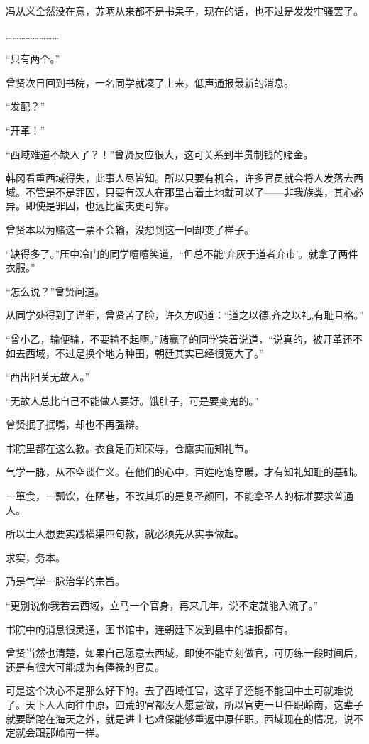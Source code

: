 冯从义全然没在意，苏昞从来都不是书呆子，现在的话，也不过是发发牢骚罢了。

……………………

“只有两个。”

曾贤次日回到书院，一名同学就凑了上来，低声通报最新的消息。

“发配？”

“开革！”

“西域难道不缺人了？！”曾贤反应很大，这可关系到半贯制钱的赌金。

韩冈看重西域得失，此事人尽皆知。所以只要有机会，许多官员就会将人发落去西域。不管是不是罪囚，只要有汉人在那里占着土地就可以了——非我族类，其心必异。即使是罪囚，也远比蛮夷更可靠。

曾贤本以为赌这一票不会输，没想到这一回却变了样子。

“缺得多了。”压中冷门的同学嘻嘻笑道，“但总不能‘弃灰于道者弃市’。就拿了两件衣服。”

“怎么说？”曾贤问道。

从同学处得到了详细，曾贤苦了脸，许久方叹道：“道之以德,齐之以礼,有耻且格。”

“曾小乙，输便输，不要输不起啊。”赌赢了的同学笑着说道，“说真的，被开革还不如去西域，不过是换个地方种田，朝廷其实已经很宽大了。”

“西出阳关无故人。”

“无故人总比自己不能做人要好。饿肚子，可是要变鬼的。”

曾贤抿了抿嘴，却也不再强辩。

书院里都在这么教。衣食足而知荣辱，仓廪实而知礼节。

气学一脉，从不空谈仁义。在他们的心中，百姓吃饱穿暖，才有知礼知耻的基础。

一箪食，一瓢饮，在陋巷，不改其乐的是复圣颜回，不能拿圣人的标准要求普通人。

所以士人想要实践横渠四句教，就必须先从实事做起。

求实，务本。

乃是气学一脉治学的宗旨。

“更别说你我若去西域，立马一个官身，再来几年，说不定就能入流了。”

书院中的消息很灵通，图书馆中，连朝廷下发到县中的塘报都有。

曾贤当然也清楚，如果自己愿意去西域，即使不能立刻做官，可历练一段时间后，还是有很大可能成为有俸禄的官员。

可是这个决心不是那么好下的。去了西域任官，这辈子还能不能回中土可就难说了。天下人人向往中原，四荒的官都没人愿意做，所以官吏一旦任职岭南，这辈子就要蹉跎在海天之外，就是进士也难保能够重返中原任职。西域现在的情况，说不定就会跟那岭南一样。

